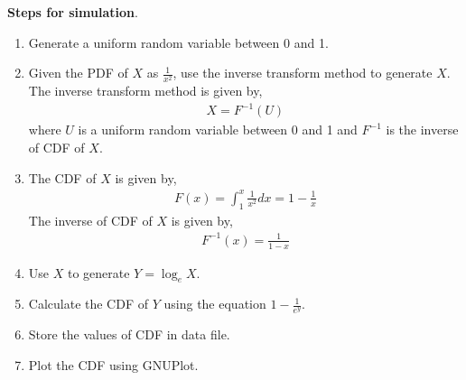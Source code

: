 \documentclass[journal,12pt, twocolumn]{IEEEtran}
\begin{document}
    \textbf{Steps for simulation}.
          \begin{enumerate}
              \item Generate a uniform random variable between 0 and 1.
              \item Given the PDF of $X$ as $\frac{1}{x^2}$, use the inverse transform method to generate $X$.\\
                    The inverse transform method is given by,
                    \begin{align}
                        X = F^{-1}(U)
                    \end{align}
                    where $U$ is a uniform random variable between 0 and 1 and $F^{-1}$ is the inverse of CDF of $X$.
              \item The CDF of $X$ is given by,
                    \begin{align}
                        F(x) = \int_{1}^{x} \frac{1}{x^2} dx = 1 - \frac{1}{x}
                    \end{align}
              The inverse of CDF of $X$ is given by,
                    \begin{align}
                        F^{-1}(x) = \frac{1}{1-x}
                    \end{align}
              \item Use $X$ to generate $Y = \log_e X$.
              \item Calculate the CDF of $Y$ using the equation $1-\frac{1}{e^y}$.
              \item Store the values of CDF in data file.
              \item Plot the CDF using GNUPlot.
          \end{enumerate}
\end{document}

